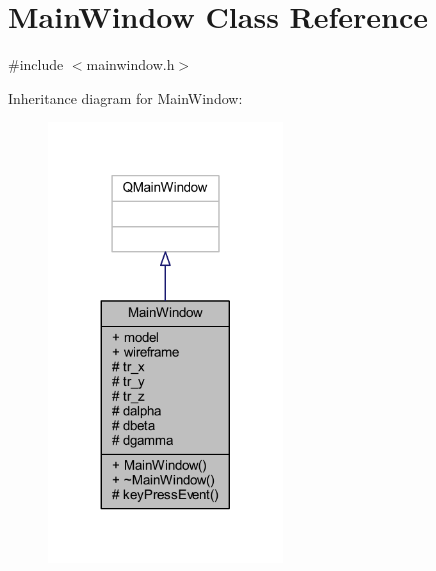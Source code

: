 \hypertarget{class_main_window}{}\section{Main\+Window Class Reference}
\label{class_main_window}


{\ttfamily \#include $<$mainwindow.\+h$>$}



Inheritance diagram for Main\+Window\+:\nopagebreak
\begin{figure}[H]
\begin{center}
\leavevmode
\includegraphics[width=176pt]{class_main_window__inherit__graph}
\end{center}
\end{figure}


